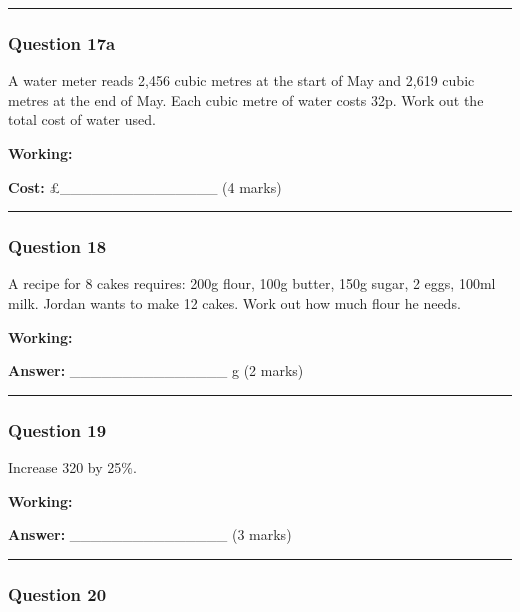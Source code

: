 \begin{center}\rule{0.5\linewidth}{0.5pt}\end{center}

\subsubsection{Question 17a}\label{question-17a}

A water meter reads 2,456 cubic metres at the start of May and 2,619
cubic metres at the end of May. Each cubic metre of water costs 32p.
Work out the total cost of water used.

\textbf{Working:}

\textbf{Cost:} £\_\_\_\_\_\_\_\_\_\_\_\_\_\_\_ (4 marks)

\begin{center}\rule{0.5\linewidth}{0.5pt}\end{center}

\subsubsection{Question 18}\label{question-18}

A recipe for 8 cakes requires: 200g flour, 100g butter, 150g sugar, 2
eggs, 100ml milk. Jordan wants to make 12 cakes. Work out how much flour
he needs.

\textbf{Working:}

\textbf{Answer:} \_\_\_\_\_\_\_\_\_\_\_\_\_\_\_ g (2 marks)

\begin{center}\rule{0.5\linewidth}{0.5pt}\end{center}

\subsubsection{Question 19}\label{question-19}

Increase 320 by 25\%.

\textbf{Working:}

\textbf{Answer:} \_\_\_\_\_\_\_\_\_\_\_\_\_\_\_ (3 marks)

\begin{center}\rule{0.5\linewidth}{0.5pt}\end{center}

\subsubsection{Question 20}\label{question-20}

